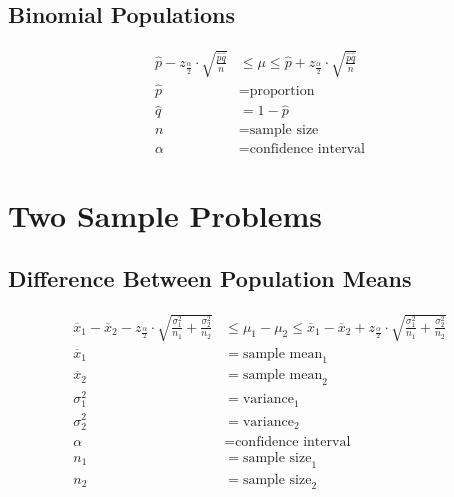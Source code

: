\documentclass{article}
\begin{document}
\subsection{Binomial Populations}

\begin{align*}
    \hat{p} -  z_{\frac{\alpha}{2}} \cdot \sqrt{\frac{\hat{p}\hat{q}}{n}} &\leq \mu \leq \hat{p} +  z_{\frac{\alpha}{2}} \cdot \sqrt{\frac{\hat{p}\hat{q}}{n}}\\
    \hat{p} &= \text{proportion}\\
    \hat{q} &= 1 - \hat{p}\\
    n &= \text{sample size}\\
    \alpha &= \text{confidence interval}
\end{align*}

\section{Two Sample Problems}
\subsection{Difference Between Population Means}
\begin{align*}
    \overline{x}_{1} - \overline{x}_{2} - z_{\frac{\alpha}{2}} \cdot \sqrt{\frac{\sigma^2_{1}}{n_{1}}+\frac{\sigma^2_{2}}{n_{2}}}  &\leq  \mu_{1} - \mu_{2} \leq \overline{x}_{1} - \overline{x}_{2} + z_{\frac{\alpha}{2}} \cdot \sqrt{\frac{\sigma^2_{1}}{n_{1}}+\frac{\sigma^2_{2}}{n_{2}}} \\ 
    \overline{x}_{1} &= \text{sample mean}_{1}\\
    \overline{x}_{2} &= \text{sample mean}_{2}\\
    \sigma^2_{1} &= \text{variance}_{1}\\
    \sigma^2_{2} &= \text{variance}_{2}\\
    \alpha &= \text{confidence interval}\\ 
    n_{1} &= \text{sample size}_{1}\\
    n_{2} &= \text{sample size}_{2}
\end{align*}
\end{document}
